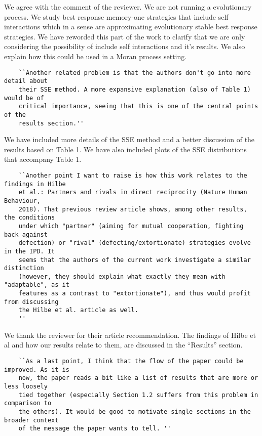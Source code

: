 \documentclass{article}
\begin{document}
We agree with the comment of the reviewer. We are not running a evolutionary
process. We study best
response memory-one strategies that include self interactions which in a sense are
approximating evolutionary stable best response strategies. We have reworded
this part of the work to clarify that we are only considering the possibility of
include self interactions and it's results. We also explain how this could be
used in a Moran process setting.

\begin{verbatim}
    ``Another related problem is that the authors don't go into more detail about
    their SSE method. A more expansive explanation (also of Table 1) would be of
    critical importance, seeing that this is one of the central points of the
    results section.''
\end{verbatim}

We have included more details of the SSE method and a better
discussion of the results based on Table 1. We have also included plots of the
SSE distributions that accompany Table 1.

\begin{verbatim}
    ``Another point I want to raise is how this work relates to the findings in Hilbe
    et al.: Partners and rivals in direct reciprocity (Nature Human Behaviour,
    2018). That previous review article shows, among other results, the conditions
    under which "partner" (aiming for mutual cooperation, fighting back against
    defection) or "rival" (defecting/extortionate) strategies evolve in the IPD. It
    seems that the authors of the current work investigate a similar distinction
    (however, they should explain what exactly they mean with "adaptable", as it
    features as a contrast to "extortionate"), and thus would profit from discussing
    the Hilbe et al. article as well.
    ''
\end{verbatim}

We thank the reviewer for their article recommendation. The findings of Hilbe et
 al and how our results relate to them, are discussed in the ``Results'' section. %

\begin{verbatim}
    ``As a last point, I think that the flow of the paper could be improved. As it is
    now, the paper reads a bit like a list of results that are more or less loosely
    tied together (especially Section 1.2 suffers from this problem in comparison to
    the others). It would be good to motivate single sections in the broader context
    of the message the paper wants to tell. ''
\end{verbatim}
\end{document}
